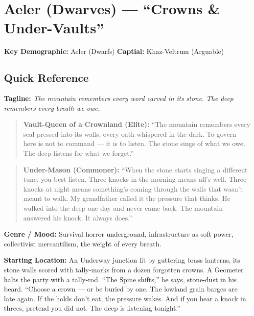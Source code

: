 \section{Aeler (Dwarves) --- ``Crowns \& Under-Vaults''}
\label{chap:aeler}

\textbf{Key Demographic: } Aeler (Dwarfs)
\textbf{Captial: } Khaz-Veltrum (Arguable)

\subsection*{Quick Reference}
\textbf{Tagline:} \textit{The mountain remembers every word carved in its stone. The deep remembers every breath we owe.}

\begin{quote}
  \textbf{Vault-Queen of a Crownland (Elite):}  
  ``The mountain remembers every seal pressed into its walls, every oath whispered in the dark. To govern here is not to command --- it is to listen. The stone sings of what we owe. The deep listens for what we forget.''
\end{quote}

\begin{quote}
  \textbf{Under-Mason (Commoner):}  
  ``When the stone starts singing a different tune, you best listen. Three knocks in the morning means all's well. Three knocks at night means something's coming through the walls that wasn't meant to walk. My grandfather called it the pressure that thinks. He walked into the deep one day and never came back. The mountain answered his knock. It always does.''
\end{quote}

\textbf{Genre / Mood:} Survival horror underground, infrastructure as soft power, collectivist mercantilism, the weight of every breath.

\textbf{Starting Location:} An Underway junction lit by guttering brass lanterns, its stone walls scored with tally-marks from a dozen forgotten crowns. A Geometer halts the party with a tally-rod. ``The Spine shifts,'' he says, stone-dust in his beard. ``Choose a crown --- or be buried by one. The lowland grain barges are late again. If the holds don't eat, the pressure wakes. And if you hear a knock in threes, pretend you did not. The deep is listening tonight.''

